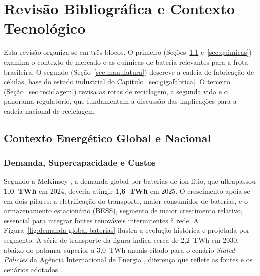 \newpage
\section{Revisão Bibliográfica e Contexto Tecnológico}
\label{sec:revisao}

Esta revisão organiza-se em três blocos. O primeiro (Seções~\ref{sec:contexto}
e~\ref{sec:quimicas}) examina o contexto de mercado e as químicas de bateria
relevantes para a frota brasileira. O segundo (Seção~\ref{sec:manufatura})
descreve a cadeia de fabricação de células, base do estudo industrial do
Capítulo~\ref{sec:gigafabrica}. O terceiro (Seção~\ref{sec:reciclagem}) revisa
as rotas de reciclagem, a segunda vida e o panorama regulatório, que fundamentam
a discussão das implicações para a cadeia nacional de reciclagem.

\subsection{Contexto Energético Global e Nacional}
\label{sec:contexto}

\subsubsection{Demanda, Supercapacidade e Custos}
\label{subsec:escala-global}

Segundo a McKinsey \cite{McKinsey2026}, a demanda global por baterias de
íon-lítio, que ultrapassou \textbf{1{,}0~TWh} em 2024, deveria atingir
\textbf{1{,}6~TWh} em 2025. O crescimento apoia-se em dois pilares: a
eletrificação do transporte, maior consumidor de baterias, e o armazenamento
estacionário (BESS), segmento de maior crescimento relativo, essencial para
integrar fontes renováveis intermitentes à rede. A
Figura~\ref{fig:demanda-global-baterias} ilustra a evolução histórica e
projetada por segmento. A série de transporte da figura indica cerca de
2{,}2~TWh em 2030, abaixo do patamar superior a 3{,}0~TWh anuais citado para o
cenário \textit{Stated Policies} da Agência Internacional de Energia
\cite{IEA2025}, diferença que reflete as fontes e os cenários adotados
.

